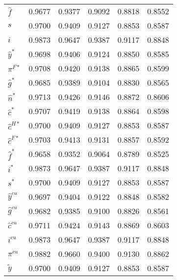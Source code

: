 \begin{center}
\begin{longtable}{lccccc}
${\hat f}              $	 & 	    0.9677	 & 	    0.9377	 & 	    0.9092	 & 	    0.8818	 & 	    0.8552 \\ 
${s}                   $	 & 	    0.9700	 & 	    0.9409	 & 	    0.9127	 & 	    0.8853	 & 	    0.8587 \\ 
${i}                   $	 & 	    0.9873	 & 	    0.9647	 & 	    0.9387	 & 	    0.9117	 & 	    0.8848 \\ 
${\hat y^*}            $	 & 	    0.9698	 & 	    0.9406	 & 	    0.9124	 & 	    0.8850	 & 	    0.8585 \\ 
${\pi^{F*}}            $	 & 	    0.9708	 & 	    0.9420	 & 	    0.9138	 & 	    0.8865	 & 	    0.8599 \\ 
${\hat g^*}            $	 & 	    0.9685	 & 	    0.9389	 & 	    0.9104	 & 	    0.8830	 & 	    0.8565 \\ 
${\hat n^*}            $	 & 	    0.9713	 & 	    0.9426	 & 	    0.9146	 & 	    0.8872	 & 	    0.8606 \\ 
${\hat c^*}            $	 & 	    0.9707	 & 	    0.9419	 & 	    0.9138	 & 	    0.8864	 & 	    0.8598 \\ 
${\hat c^{H*}}         $	 & 	    0.9700	 & 	    0.9409	 & 	    0.9127	 & 	    0.8853	 & 	    0.8587 \\ 
${\hat c^{F*}}         $	 & 	    0.9703	 & 	    0.9413	 & 	    0.9131	 & 	    0.8857	 & 	    0.8592 \\ 
${\hat f^*}            $	 & 	    0.9658	 & 	    0.9352	 & 	    0.9064	 & 	    0.8789	 & 	    0.8525 \\ 
${i^*}                 $	 & 	    0.9873	 & 	    0.9647	 & 	    0.9387	 & 	    0.9117	 & 	    0.8848 \\ 
${s^*}                 $	 & 	    0.9700	 & 	    0.9409	 & 	    0.9127	 & 	    0.8853	 & 	    0.8587 \\ 
${\hat y^{cu}}         $	 & 	    0.9697	 & 	    0.9404	 & 	    0.9122	 & 	    0.8848	 & 	    0.8582 \\ 
${\hat g^{cu}}         $	 & 	    0.9682	 & 	    0.9385	 & 	    0.9100	 & 	    0.8826	 & 	    0.8561 \\ 
${\hat c^{cu}}         $	 & 	    0.9711	 & 	    0.9424	 & 	    0.9143	 & 	    0.8869	 & 	    0.8603 \\ 
${i^{cu}}              $	 & 	    0.9873	 & 	    0.9647	 & 	    0.9387	 & 	    0.9117	 & 	    0.8848 \\ 
${\pi^{cu}}            $	 & 	    0.9882	 & 	    0.9660	 & 	    0.9400	 & 	    0.9130	 & 	    0.8862 \\ 
${\tilde y}            $	 & 	    0.9700	 & 	    0.9409	 & 	    0.9127	 & 	    0.8853	 & 	    0.8587 \\ 

\end{longtable}
\end{center}
